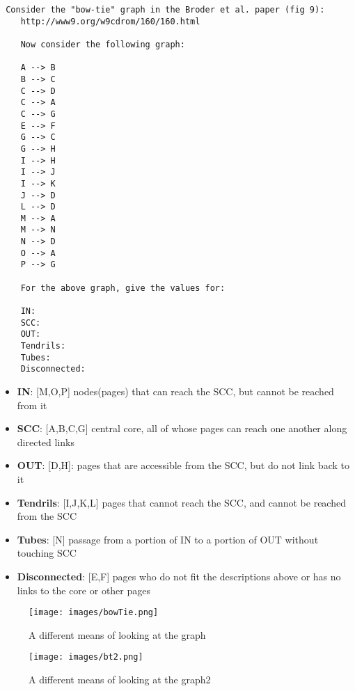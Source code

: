 \documentclass[letterpaper,10pt]{article}
\begin{document}
\begin{verbatim}
 Consider the "bow-tie" graph in the Broder et al. paper (fig 9):
    http://www9.org/w9cdrom/160/160.html

    Now consider the following graph:

    A --> B
    B --> C
    C --> D
    C --> A
    C --> G
    E --> F
    G --> C
    G --> H
    I --> H
    I --> J
    I --> K
    J --> D 
    L --> D
    M --> A
    M --> N
    N --> D
    O --> A
    P --> G 
    
    For the above graph, give the values for:

    IN: 
    SCC: 
    OUT: 
    Tendrils: 
    Tubes: 
    Disconnected:
\end{verbatim}

\begin{itemize}
\item \textbf{IN}: [M,O,P]  nodes(pages) that can reach the SCC, but cannot be reached from it
\item \textbf{SCC}: [A,B,C,G]  central core, all of whose pages can reach one another along directed links
\item \textbf{OUT}: [D,H]: pages that are accessible from the SCC, but do not link back to it
\item \textbf{Tendrils}: [I,J,K,L] pages that cannot reach the SCC, and cannot be reached from the SCC


\item \textbf{Tubes}: [N]  passage from a portion of IN to a portion of OUT without touching SCC 
  
\item   \textbf{Disconnected}: [E,F] pages who do not fit the descriptions above or has no links to the core or other pages

\end{itemize}

\begin{figure}[!ht]
\texttt{[image: images/bowTie.png]}
\caption{A different means of looking at the graph}
\label{fig:bt1}
\end{figure}

\begin{figure}[!ht]
\texttt{[image: images/bt2.png]}
\caption{A different means of looking at the graph2}
\label{fig:bt2}
\end{figure}
\end{document}
